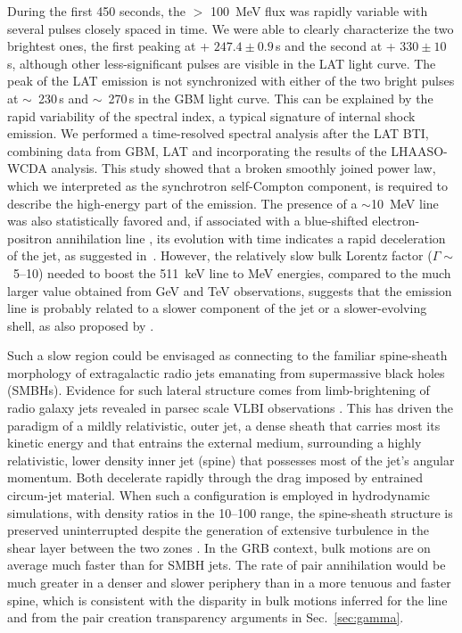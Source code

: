 \documentclass[preprint]{aastex631}
\begin{document}
During the first 450 seconds, the $>$ 100~MeV flux was rapidly variable with several pulses closely spaced in time. 
We were able to clearly characterize the two brightest ones, the first peaking at \trig + $247.4 \pm 0.9$\,s and the second at \trig + $330 \pm 10$\,s, although other less-significant pulses are visible in the LAT light curve. The peak of the LAT emission is not synchronized with either of the two bright pulses at $\sim$~230\,s and $\sim$~270\,s in the GBM light curve. This can be explained by the rapid variability of the spectral index, a typical signature of internal shock emission.
We performed a time-resolved spectral analysis after the LAT BTI, combining data from GBM, LAT and incorporating the results of the LHAASO-WCDA analysis. 
This study showed that a broken smoothly joined power law, which we interpreted as the synchrotron self-Compton component, is required to describe the high-energy part of the emission.
The presence of a $\sim$10~MeV line was also statistically favored and, if associated with a blue-shifted electron-positron annihilation line \citep{BOAT_LINE}, its evolution with time indicates a rapid deceleration of the jet, as suggested in~\citet{2024arXiv240312851Z}.
However, the relatively slow bulk Lorentz factor ($\Gamma \sim$~5--10) needed to boost the 511~keV line to MeV energies, compared to the much larger value obtained from GeV and TeV observations, suggests that the emission line is probably related to a slower component of the jet or a slower-evolving shell, as also proposed by \citet{BOAT_LINE}.

Such a slow region could be envisaged as connecting to the familiar spine-sheath morphology of extragalactic radio jets emanating from supermassive black holes (SMBHs).  
Evidence for such lateral structure comes from limb-brightening of
radio galaxy jets revealed in parsec scale VLBI observations \citep[e.g.,][]{2002MNRAS.336..328L,Giroletti-2004-ApJ}.  
This has driven the paradigm \citep[e.g.,][]{2005A&A...432..401G} of a mildly relativistic, outer jet, a dense sheath that carries most its kinetic energy and that entrains the external medium, surrounding a highly relativistic, lower density inner jet (spine) that possesses most of the jet's angular momentum.  
Both decelerate rapidly through the drag imposed by entrained circum-jet material. When such a configuration is employed in hydrodynamic simulations, with density ratios in the 10--100 range, the spine-sheath structure is preserved uninterrupted despite the generation of extensive turbulence in the shear layer between the two zones \citep[e.g.,][]{Meliani-2008-AandA}. 
In the GRB context, bulk motions are on average much faster than for SMBH jets. The rate of pair annihilation would be much greater in a denser and slower periphery than in a more tenuous and faster spine, which is consistent with the disparity in bulk motions inferred for the line and from the pair creation transparency arguments in Sec.~\ref{sec:gamma}.
\end{document}
